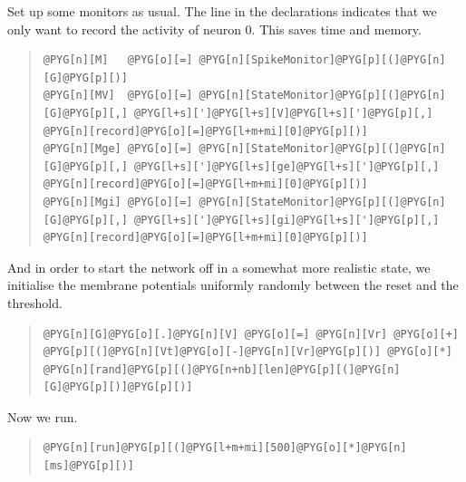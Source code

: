 \documentclass[letterpaper,10pt,english]{manual}
\begin{document}
Set up some monitors as usual. The line  in the \hyperlink{brian.StateMonitor}{}
declarations indicates that we only want to record the activity of
neuron 0. This saves time and memory.
\begin{quote}

\begin{Verbatim}[commandchars=@\[\]]
@PYG[n][M]   @PYG[o][=] @PYG[n][SpikeMonitor]@PYG[p][(]@PYG[n][G]@PYG[p][)]
@PYG[n][MV]  @PYG[o][=] @PYG[n][StateMonitor]@PYG[p][(]@PYG[n][G]@PYG[p][,] @PYG[l+s][']@PYG[l+s][V]@PYG[l+s][']@PYG[p][,] @PYG[n][record]@PYG[o][=]@PYG[l+m+mi][0]@PYG[p][)]
@PYG[n][Mge] @PYG[o][=] @PYG[n][StateMonitor]@PYG[p][(]@PYG[n][G]@PYG[p][,] @PYG[l+s][']@PYG[l+s][ge]@PYG[l+s][']@PYG[p][,] @PYG[n][record]@PYG[o][=]@PYG[l+m+mi][0]@PYG[p][)]
@PYG[n][Mgi] @PYG[o][=] @PYG[n][StateMonitor]@PYG[p][(]@PYG[n][G]@PYG[p][,] @PYG[l+s][']@PYG[l+s][gi]@PYG[l+s][']@PYG[p][,] @PYG[n][record]@PYG[o][=]@PYG[l+m+mi][0]@PYG[p][)]
\end{Verbatim}
\end{quote}

And in order to start the network off in a somewhat
more realistic state, we initialise the membrane
potentials uniformly randomly between the reset and
the threshold.
\begin{quote}

\begin{Verbatim}[commandchars=@\[\]]
@PYG[n][G]@PYG[o][.]@PYG[n][V] @PYG[o][=] @PYG[n][Vr] @PYG[o][+] @PYG[p][(]@PYG[n][Vt]@PYG[o][-]@PYG[n][Vr]@PYG[p][)] @PYG[o][*] @PYG[n][rand]@PYG[p][(]@PYG[n+nb][len]@PYG[p][(]@PYG[n][G]@PYG[p][)]@PYG[p][)]
\end{Verbatim}
\end{quote}

Now we run.
\begin{quote}

\begin{Verbatim}[commandchars=@\[\]]
@PYG[n][run]@PYG[p][(]@PYG[l+m+mi][500]@PYG[o][*]@PYG[n][ms]@PYG[p][)]
\end{Verbatim}
\end{quote}
\end{document}
